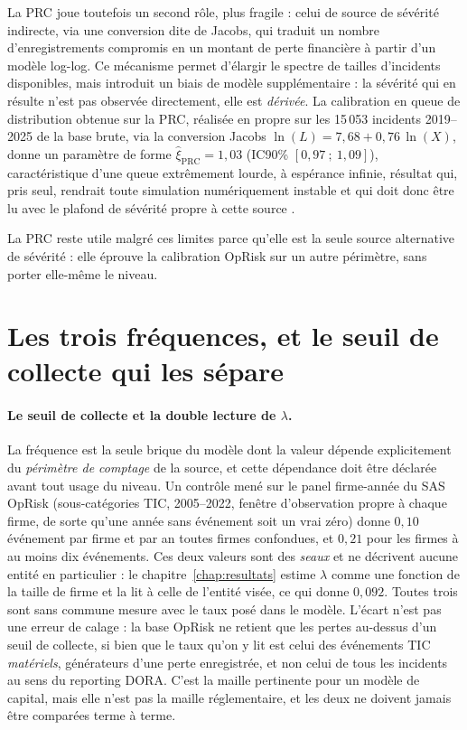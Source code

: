 La PRC joue toutefois un second rôle, plus fragile : celui de source de
sévérité indirecte, via une conversion dite de Jacobs, qui traduit un nombre
d'enregistrements compromis en un montant de perte financière à partir d'un
modèle log-log. Ce mécanisme permet d'élargir le spectre de tailles
d'incidents disponibles, mais introduit un biais de modèle supplémentaire :
la sévérité qui en résulte n'est pas observée directement, elle est
\emph{dérivée}. La calibration en queue de distribution obtenue sur la PRC,
réalisée en propre sur les 15\,053 incidents 2019--2025 de la base brute,
via la conversion Jacobs $\ln(L) = 7{,}68 + 0{,}76\,\ln(X)$, donne un
paramètre de forme $\hat{\xi}_{\text{PRC}} = 1{,}03$ (IC90\%
$[0{,}97~;~1{,}09]$), caractéristique d'une queue extrêmement lourde, à
espérance infinie, résultat qui, pris seul, rendrait toute simulation
numériquement instable et qui doit donc être lu avec le plafond de sévérité
propre à cette source \matcomp.

La PRC reste utile malgré ces limites parce qu'elle est la seule source
alternative de sévérité : elle éprouve la calibration OpRisk sur un autre
périmètre, sans porter elle-même le niveau.


\section{Les trois fréquences, et le seuil de collecte qui les sépare}


\paragraph{Le seuil de collecte et la double lecture de $\lambda$.}
La fréquence est la seule brique du modèle dont la valeur dépende
explicitement du \emph{périmètre de comptage} de la source, et cette dépendance
doit être déclarée avant tout usage du niveau. Un contrôle mené sur le panel
firme-année du SAS OpRisk (sous-catégories TIC, 2005--2022, fenêtre
d'observation propre à chaque firme, de sorte qu'une année sans événement soit
un vrai zéro) donne $0{,}10$ événement par firme et par an toutes firmes
confondues, et $0{,}21$ pour les firmes à au moins dix événements. Ces deux
valeurs sont des \emph{seaux} et ne décrivent aucune entité en particulier : le
chapitre~\ref{chap:resultats} estime $\lambda$ comme une fonction de la taille de
firme et la lit à celle de l'entité visée, ce qui donne $0{,}092$. Toutes trois
sont sans commune mesure avec le taux posé dans le modèle. L'écart n'est pas une erreur de
calage : la base OpRisk ne retient que les pertes au-dessus d'un seuil
de collecte, si bien que le taux qu'on y lit est celui des événements TIC
\emph{matériels}, générateurs d'une perte enregistrée, et non celui de tous les
incidents au sens du reporting DORA. C'est la maille pertinente pour un modèle
de capital, mais elle n'est pas la maille réglementaire, et les deux ne doivent
jamais être comparées terme à terme.

